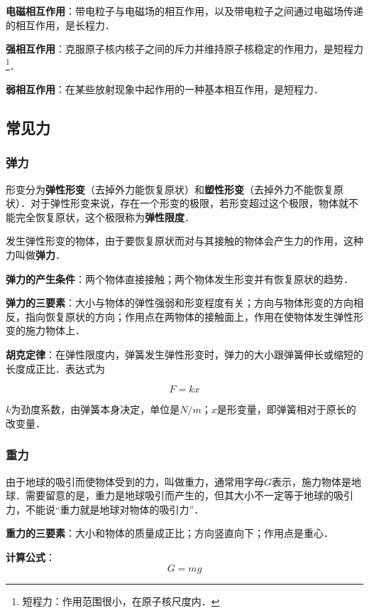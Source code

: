 \textbf{电磁相互作用}：带电粒子与电磁场的相互作用，以及带电粒子之间通过电磁场传递的相互作用，是长程力．

\textbf{强相互作用}：克服原子核内核子之间的斥力并维持原子核稳定的作用力，是短程力\footnote{短程力：作用范围很小，在原子核尺度内．}．

\textbf{弱相互作用}：在某些放射现象中起作用的一种基本相互作用，是短程力．

\subsection{常见力}

\subsubsection{弹力}
形变分为\textbf{弹性形变}（去掉外力能恢复原状）和\textbf{塑性形变}（去掉外力不能恢复原状）．对于弹性形变来说，存在一个形变的极限，若形变超过这个极限，物体就不能完全恢复原状，这个极限称为\textbf{弹性限度}．

发生弹性形变的物体，由于要恢复原状而对与其接触的物体会产生力的作用，这种力叫做\textbf{弹力}．

\textbf{弹力的产生条件}：两个物体直接接触；两个物体发生形变并有恢复原状的趋势．

\textbf{弹力的三要素}：大小与物体的弹性强弱和形变程度有关；方向与物体形变的方向相反，指向恢复原状的方向；作用点在两物体的接触面上，作用在使物体发生弹性形变的施力物体上．

\textbf{胡克定律}：在弹性限度内，弹簧发生弹性形变时，弹力的大小跟弹簧伸长或缩短的长度成正比．表达式为

\begin{equation}
F=kx
\end{equation}

$k$为劲度系数，由弹簧本身决定，单位是$N/m$；$x$是形变量，即弹簧相对于原长的改变量．

\subsubsection{重力}
由于地球的吸引而使物体受到的力，叫做重力，通常用字母$G$表示，施力物体是地球．需要留意的是，重力是地球吸引而产生的，但其大小不一定等于地球的吸引力，不能说“重力就是地球对物体的吸引力”．

\textbf{重力的三要素}：大小和物体的质量成正比；方向竖直向下；作用点是重心．

\textbf{计算公式}：
\begin{equation}
G=mg
\end{equation}

